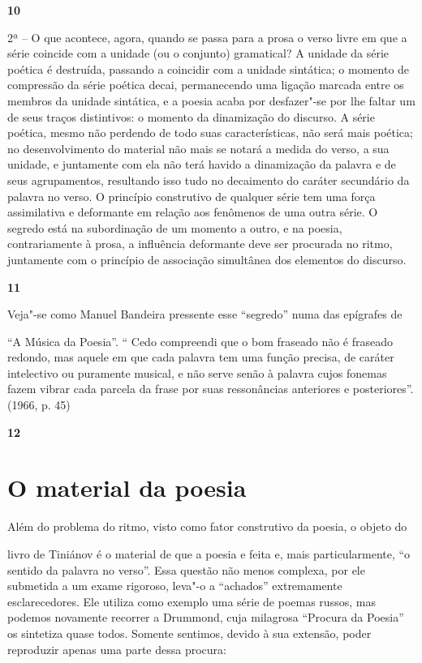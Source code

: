 \textbf{10}

2ª -- O que acontece, agora, quando se passa para a prosa o verso livre
em que a série coincide com a unidade (ou o conjunto) gramatical? A
unidade da série poética é destruída, passando a coincidir com a unidade
sintática; o momento de compressão da série poética decai, permanecendo
uma ligação marcada entre os membros da unidade sintática, e a poesia
acaba por desfazer"-se por lhe faltar um de seus traços distintivos: o
momento da dinamização do discurso. A série poética, mesmo não perdendo
de todo suas características, não será mais poética; no desenvolvimento
do material não mais se notará a medida do verso, a sua unidade, e
juntamente com ela não terá havido a dinamização da palavra e de seus
agrupamentos, resultando isso tudo no decaimento do caráter secundário
da palavra no verso. O princípio construtivo de qualquer série tem uma
força assimilativa e deformante em relação aos fenômenos de uma outra
série. O segredo está na subordinação de um momento a outro, e na
poesia, contrariamente à prosa, a influência deformante deve ser
procurada no ritmo, juntamente com o princípio de associação simultânea
dos elementos do discurso.

\textbf{11}

Veja"-se como Manuel Bandeira pressente esse ``segredo'' numa das
epígrafes de

``A Música da Poesia''. `` Cedo compreendi que o bom fraseado não é
fraseado redondo, mas aquele em que cada palavra tem uma função precisa,
de caráter intelectivo ou puramente musical, e não serve senão à palavra
cujos fonemas fazem vibrar cada parcela da frase por suas ressonâncias
anteriores e posteriores''. (1966, p. 45)

\textbf{12}

\section{O material da poesia}

Além do problema do ritmo, visto como fator construtivo da poesia, o
objeto do

livro de Tiniánov é o material de que a poesia e feita e, mais
particularmente, ``o sentido da palavra no verso''. Essa questão não
menos complexa, por ele submetida a um exame rigoroso, leva"-o a
``achados'' extremamente esclarecedores. Ele utiliza como exemplo uma
série de poemas russos, mas podemos novamente recorrer a Drummond, cuja
milagrosa ``Procura da Poesia'' os sintetiza quase todos. Somente
sentimos, devido à sua extensão, poder reproduzir apenas uma parte dessa
procura:

